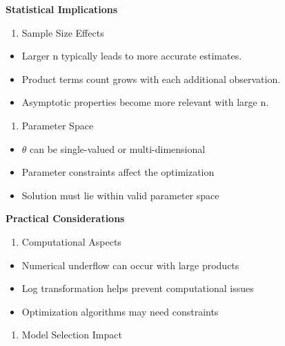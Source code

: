\documentclass[
  12 pt,
  a4paper,
]{book}
\providecommand{\tightlist}{%
  \setlength{\itemsep}{0pt}\setlength{\parskip}{0pt}}
\numberwithin{equation}{section}
\theoremstyle{plain}      %
\theoremstyle{definition} %
\theoremstyle{remark}     %
\theoremstyle{note}         %
\begin{document}
\textbf{Statistical Implications}

\begin{enumerate}
\def\labelenumi{\arabic{enumi}.}
\tightlist
\item
  Sample Size Effects
\end{enumerate}

\begin{itemize}
\tightlist
\item
  Larger n typically leads to more accurate estimates.
\item
  Product terms count grows with each additional observation.
\item
  Asymptotic properties become more relevant with large n.
\end{itemize}

\begin{enumerate}
\def\labelenumi{\arabic{enumi}.}
\setcounter{enumi}{1}
\tightlist
\item
  Parameter Space
\end{enumerate}

\begin{itemize}
\tightlist
\item
  \(\theta\) can be single-valued or multi-dimensional
\item
  Parameter constraints affect the optimization
\item
  Solution must lie within valid parameter space
\end{itemize}

\textbf{Practical Considerations}

\begin{enumerate}
\def\labelenumi{\arabic{enumi}.}
\tightlist
\item
  Computational Aspects
\end{enumerate}

\begin{itemize}
\tightlist
\item
  Numerical underflow can occur with large products
\item
  Log transformation helps prevent computational issues
\item
  Optimization algorithms may need constraints
\end{itemize}

\begin{enumerate}
\def\labelenumi{\arabic{enumi}.}
\setcounter{enumi}{1}
\tightlist
\item
  Model Selection Impact
\end{enumerate}
\end{document}

